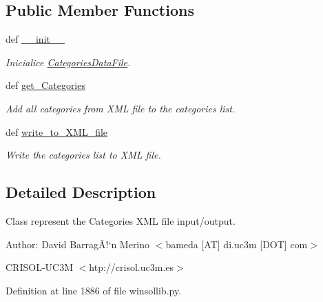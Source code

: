 \subsection*{Public Member Functions}
\begin{CompactItemize}
\item 
def \hyperlink{classwinsollib_1_1CategoriesDataFile_cd08ce6d213ed244d0c27fc9af77bceb}{\_\-\_\-init\_\-\_\-}
\begin{CompactList}\small\item\em Inicialice \hyperlink{classwinsollib_1_1CategoriesDataFile}{Categories\-Data\-File}. \item\end{CompactList}\item 
def \hyperlink{classwinsollib_1_1CategoriesDataFile_8f60a8fa652006b7f272e3b90b1d4eef}{get\_\-Categories}
\begin{CompactList}\small\item\em Add all categories from XML file to the categories list. \item\end{CompactList}\item 
def \hyperlink{classwinsollib_1_1CategoriesDataFile_cad84f36c2d05d1fee6dfae84165da0a}{write\_\-to\_\-XML\_\-file}
\begin{CompactList}\small\item\em Write the categories list to XML file. \item\end{CompactList}\end{CompactItemize}


\subsection{Detailed Description}
Class represent the Categories XML file input/output. 

\begin{Desc}
\item[Author:]David Barrag\~{A}!`n Merino $<$bameda \mbox{[}AT\mbox{]} di.uc3m \mbox{[}DOT\mbox{]} com$>$ 

CRISOL-UC3M $<$htp://crisol.uc3m.es$>$ \end{Desc}




Definition at line 1886 of file winsollib.py.

